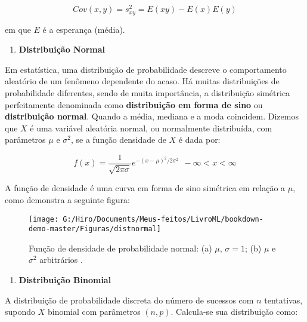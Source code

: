 \documentclass[
  openany]{book}
\providecommand{\tightlist}{%
  \setlength{\itemsep}{0pt}\setlength{\parskip}{0pt}}
\begin{document}
\begin{equation}
    Cov(x,y)=s^2_{xy}=E(xy)-E(x)E(y)
    \label{eq:covariancia}
\end{equation}

em que \(E\) é a esperança (média).

\begin{enumerate}
\def\labelenumi{\arabic{enumi}.}
\setcounter{enumi}{4}
\tightlist
\item
  \textbf{Distribuição Normal}
\end{enumerate}

Em estatística, uma distribuição de probabilidade descreve o comportamento aleatório de um fenômeno dependente do acaso. Há muitas distribuições de probabilidade diferentes, sendo de muita importância, a distribuição simétrica perfeitamente denominada como \textbf{distribuição em forma de sino} ou \textbf{distribuição normal}. Quando a média, mediana e a moda coincidem. Dizemos que \(X\) é uma variável aleatória normal, ou normalmente distribuída, com parâmetros \(\mu\) e \(\sigma^2\), se a função densidade de \(X\) é dada por:

\begin{equation}
    f(x)=\frac{1}{\sqrt{2\pi \sigma}}e^{-(x-\mu)^2/2\sigma^2} \ \ -\infty<x<\infty
    \label{eq:fnormal}
\end{equation}

A função de densidade é uma curva em forma de sino simétrica em relação a \(\mu\), como demonstra a seguinte figura:

\begin{figure}

{\centering \texttt{[image: G:/Hiro/Documents/Meus-feitos/LivroML/bookdown-demo-master/Figuras/distnormal]} 

}

\caption{Função de densidade de probabilidade normal: (a) \(\mu\), \(\sigma=1\); (b) \(\mu\) e \(\sigma^2\) arbitrários \citep{rossprobability}.}\label{fig:distnormal}
\end{figure}



\begin{enumerate}
\def\labelenumi{\arabic{enumi}.}
\setcounter{enumi}{5}
\tightlist
\item
  \textbf{Distribuição Binomial}
\end{enumerate}

A distribuição de probabilidade discreta do número de sucessos com \(n\) tentativas, supondo \(X\) binomial com parâmetros \((n,p)\). Calcula-se sua distribuição como:
\end{document}

